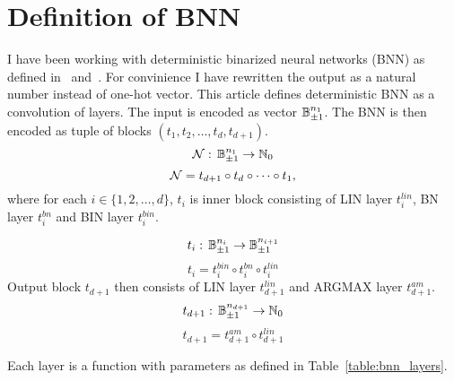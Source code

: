 \documentclass[
    digital,
    color,
    oneside,
    sansbold,
    lot,
    nolof
]{fithesis}
\begin{document}
\section{Definition of BNN}\label{section:binneurnetw}
I have been working with deterministic binarized neural networks (BNN)
as defined in~\cite{Hubara2016BinarizedNN} and~\cite{10.1145/3563212}.
For convinience I have rewritten the output as a natural number instead of
one-hot vector.
This article defines deterministic BNN as a convolution of layers.
The input is
encoded as vector $\mathbb{B}_{\pm 1}^{n_1}$. The BNN is then encoded as tuple of blocks
$(t_1, t_2, \dots, t_d, t_{d+1})$.
\begin{equation*}
    \mathcal{N}: \, \mathbb{B}_{\pm 1}^{n_1} \to \mathbb{N}_0
\end{equation*}
\begin{equation}
    \mathcal{N} = t_{d+1} \circ t_d \circ \dots \circ t_1,
\end{equation}
where for each $i\in \{1, 2, \dots, d\}$, $t_i$ is inner block consisting
of LIN layer $t_i^{lin}$, BN layer $t_i^{bn}$ and BIN layer $t_i^{bin}$.

\begin{equation*}
    t_i: \, \mathbb{B}_{\pm 1}^{n_i} \to \mathbb{B}_{\pm 1}^{n_{i+1}}
\end{equation*}
\begin{equation}
    t_i = t_i^{bin} \circ t_i^{bn} \circ t_i^{lin}
\end{equation}
Output block $t_{d+1}$ then consists of LIN layer $t_{d+1}^{lin}$ and ARGMAX layer
$t_{d+1}^{am}$.
\begin{equation*}
    t_{d+1}: \, \mathbb{B}_{\pm 1}^{n_{d+1}} \to \mathbb{N}_0
\end{equation*}
\begin{equation}
    t_{d+1} = t_{d+1}^{am} \circ t_{d+1}^{lin}
\end{equation}

Each layer is a function with parameters as defined in Table~\ref{table:bnn_layers}.
\end{document}
